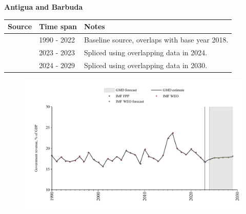 \documentclass[12pt,a4paper,landscape]{article}
\begin{document}
\begin{adjustbox}{max totalsize={\paperwidth}{\paperheight},center}
\begin{minipage}[t][\textheight][t]{\textwidth}
\vspace*{0.5cm}
{}
\begin{center}
{\Large\bfseries Antigua and Barbuda}
\end{center}
\vspace{0.5cm}
\begin{table}[H]
\centering
\small
\begin{tabular}{|l|l|l|}
\hline
\textbf{Source} & \textbf{Time span} & \textbf{Notes} \\
\hline
\rowcolor{white}\cite{IMF_WEO}& 1990 - 2022 &Baseline source, overlaps with base year 2018.\\
\rowcolor{lightgray}\cite{IMF_FPP}& 2023 - 2023 &Spliced using overlapping data in 2024.\\
\rowcolor{white}\cite{IMF_WEO_forecast}& 2024 - 2029 &Spliced using overlapping data in 2030.\\
\hline
\end{tabular}
\end{table}
\begin{figure}[H]
\centering
\includegraphics[width=\textwidth,height=0.6\textheight,keepaspectratio]{graphs/ATG_govrev_GDP.pdf}
\end{figure}
\end{minipage}
\end{adjustbox}
\end{document}
